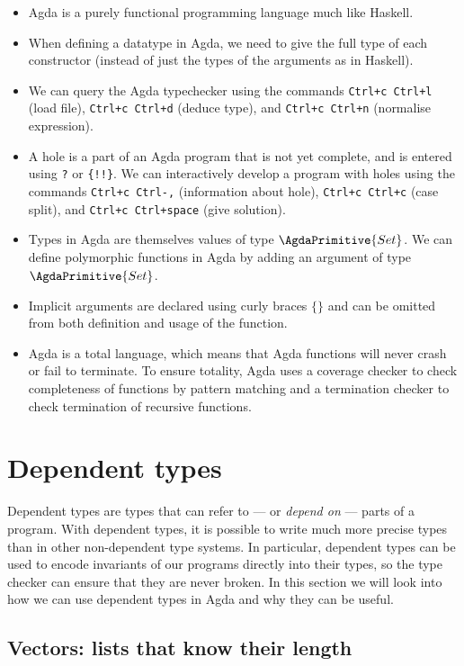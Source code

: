 \documentclass[a4paper,UKenglish]{tufte-handout}
\theoremstyle{definition}
\newcommand\prim[1]{{\AgdaPrimitive{#1}}}
\newcommand\ty[1]{{{\prim{Set}}_{#1}}}
\begin{document}
\begin{itemize}
  \item Agda is a purely functional programming language much like
Haskell.
  \item When defining a datatype in Agda, we need to give the full
type of each constructor (instead of just the types of the arguments
as in Haskell).
  \item We can query the Agda typechecker using the commands
\texttt{Ctrl+c Ctrl+l} (load file), \texttt{Ctrl+c Ctrl+d} (deduce
type), and \texttt{Ctrl+c Ctrl+n} (normalise expression).
  \item A hole is a part of an Agda program that is not yet complete,
and is entered using \texttt{?} or \texttt{\{!!\}}. We can
interactively develop a program with holes using the commands
\texttt{Ctrl+c Ctrl-,} (information about hole), \texttt{Ctrl+c
Ctrl+c} (case split), and \texttt{Ctrl+c Ctrl+space} (give solution).
  \item Types in Agda are themselves values of type $\ty{}$. We can
define polymorphic functions in Agda by adding an argument of type
$\ty{}$.
  \item Implicit arguments are declared using curly braces $\{\}$ and
can be omitted from both definition and usage of the function.
  \item Agda is a total language, which means that Agda functions will
never crash or fail to terminate. To ensure totality, Agda uses a
coverage checker to check completeness of functions by pattern
matching and a termination checker to check termination of recursive
functions.
\end{itemize}




\section{Dependent types}

Dependent types are types that can refer to --- or \emph{depend on} ---
parts of a program. With dependent types, it is possible to write much
more precise types than in other non-dependent type systems. In
particular, dependent types can be used to encode invariants of our
programs directly into their types, so the type checker can ensure
that they are never broken. In this section we will look into how we
can use dependent types in Agda and why they can be useful.

\subsection{Vectors: lists that know their length}
\end{document}
